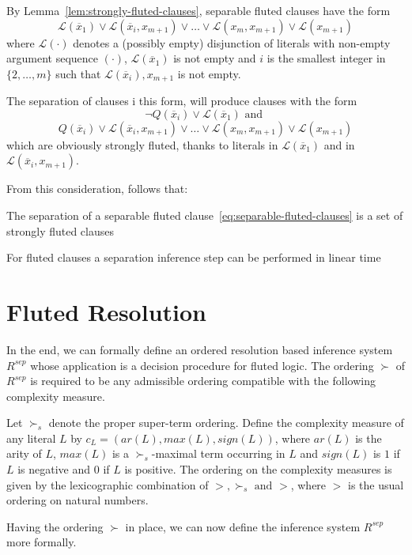 By Lemma~\ref{lem:strongly-fluted-clauses}, separable fluted clauses have the form
\begin{equation}\label{eq:separable-fluted-clauses}
  \mathcal{L}(\overline{x}_1)\lor \mathcal{L}(\overline{x}_i,x_{m+1}) \lor \ldots \lor \mathcal{L}(x_m, x_{m+1}) \lor \mathcal{L}(x_{m+1})
\end{equation}
where \(\mathcal{L}(\cdot)\) denotes a (possibly empty) disjunction of literals with non-empty argument sequence \((\cdot)\), \(\mathcal{L}(\overline{x}_1)\) is not empty and \(i\) is the smallest integer in \(\{2,\ldots, m\}\) such that \(\mathcal{L}(\overline{x}_i), x_{m+1}\) is not empty.

The separation of clauses i this form, will produce clauses with the form
\[
  \neg Q(\overline{x}_i) \lor \mathcal{L}(\overline{x}_1) \text{ and }
\]
\[
  Q(\overline{x}_i) \lor \mathcal{L}(\overline{x}_i,x_{m+1}) \lor \ldots \lor \mathcal{L}(x_m, x_{m+1}) \lor \mathcal{L}(x_{m+1})
\]
which are obviously strongly fluted, thanks to literals in \(\mathcal{L}(\overline{x}_1)\) and in \(\mathcal{L}(\overline{x}_i,x_{m+1})\).

From this consideration, follows that:
\begin{lemma}\label{lem:separation-fluted}
  The separation of a separable fluted clause~\ref{eq:separable-fluted-clauses} is a set of strongly fluted clauses
\end{lemma}
\begin{lemma}
  For fluted clauses a separation inference step can be performed in linear time
\end{lemma}


\section{Fluted Resolution}\label{sec:fluted-resolution}

In the end, we can formally define an ordered resolution based inference system \(R^{sep}\) whose application is a decision procedure for fluted logic.
The ordering \(\succ\) of \(R^{sep}\) is required to be any admissible ordering compatible with the following complexity measure.

\begin{definition}
  Let \(\succ_s\) denote the proper super-term ordering. Define the complexity measure of any literal \(L\) by \(c_L = (ar(L),max(L),sign(L))\), where \(ar(L)\) is the arity of \(L\), \(max(L)\) is a \(\succ_s\)-maximal term occurring in \(L\) and \(sign(L)\) is \(1\) if \(L\) is negative and \(0\) if \(L\) is positive. %
  The ordering on the complexity measures is given by the lexicographic combination of \(>,\succ_s \text{ and } >\), where \(>\) is the usual ordering on natural numbers.
\end{definition}
Having the ordering \(\succ\) in place, we can now define the inference system \(R^{sep}\) more formally.

